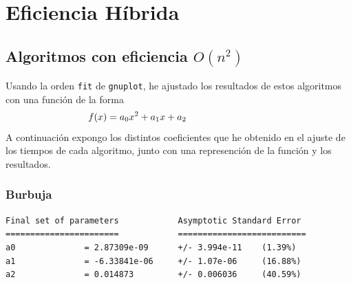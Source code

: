 \documentclass[a4]{article}
\begin{document}
\begin{figure}[H]
\end{figure}

\newpage

\section{Eficiencia Híbrida}
\setcounter{subfigure}{0}

\subsection{Algoritmos con eficiencia $O(n^2)$}

\begin{flushleft}
  Usando la orden \texttt{fit} de \texttt{gnuplot}, he ajustado los
  resultados de estos algoritmos con una función de la
  forma \[\hspace{-30mm}f(x)=a_0x^2+a_1x+a_2\] A continuación expongo
  los distintos coeficientes que he obtenido en el ajuste de los
  tiempos de cada algoritmo, junto con una represención de la función
  y los resultados.
\end{flushleft}

\subsubsection{Burbuja}

\begin{verbatim}
Final set of parameters            Asymptotic Standard Error
=======================            ==========================
a0              = 2.87309e-09      +/- 3.994e-11    (1.39%)
a1              = -6.33841e-06     +/- 1.07e-06     (16.88%)
a2              = 0.014873         +/- 0.006036     (40.59%)
\end{verbatim}
\end{document}
